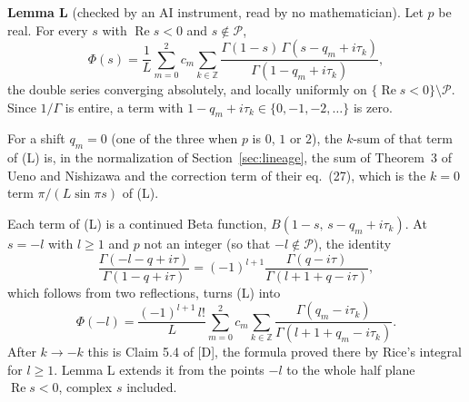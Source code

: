 \documentclass[11pt]{article}
\newcommand{\re}{\operatorname{Re}}
\begin{document}
\noindent\textbf{Lemma L} (checked by an AI instrument, read by no mathematician). Let $p$ be real. For every $s$ with $\re s<0$ and $s\notin\mathcal{P}$,
\begin{equation*}
\Phi(s)=\frac1L\sum_{m=0}^{2}c_m\sum_{k\in\mathbb{Z}}\frac{\Gamma(1-s)\,\Gamma(s-q_m+i\tau_k)}{\Gamma(1-q_m+i\tau_k)}, \tag{L}
\end{equation*}
the double series converging absolutely, and locally uniformly on $\{\re s<0\}\setminus\mathcal{P}$. Since $1/\Gamma$ is entire, a term with $1-q_m+i\tau_k\in\{0,-1,-2,\dots\}$ is zero.

\medskip
For a shift $q_m=0$ (one of the three when $p$ is $0$, $1$ or $2$), the $k$-sum of that term of (L) is, in the normalization of Section~\ref{sec:lineage}, the sum of Theorem~3 of Ueno and Nishizawa \cite[eq.~(32), at $z=1$]{UN} and the correction term of their eq.~(27), which is the $k=0$ term $\pi/(L\sin\pi s)$ of (L).

\medskip
Each term of (L) is a continued Beta function, $B(1-s,\,s-q_m+i\tau_k)$. At $s=-l$ with $l\ge1$ and $p$ not an integer (so that $-l\notin\mathcal{P}$), the identity
\[
\frac{\Gamma(-l-q+i\tau)}{\Gamma(1-q+i\tau)}=(-1)^{l+1}\frac{\Gamma(q-i\tau)}{\Gamma(l+1+q-i\tau)},
\]
which follows from two reflections, turns (L) into
\[
\Phi(-l)=\frac{(-1)^{l+1}\,l!}{L}\sum_{m=0}^{2}c_m\sum_{k\in\mathbb{Z}}\frac{\Gamma(q_m-i\tau_k)}{\Gamma(l+1+q_m-i\tau_k)}.
\]
After $k\to-k$ this is Claim 5.4 of [D], the formula proved there by Rice's integral for $l\ge1$. Lemma L extends it from the points $-l$ to the whole half plane $\re s<0$, complex $s$ included.
\end{document}
